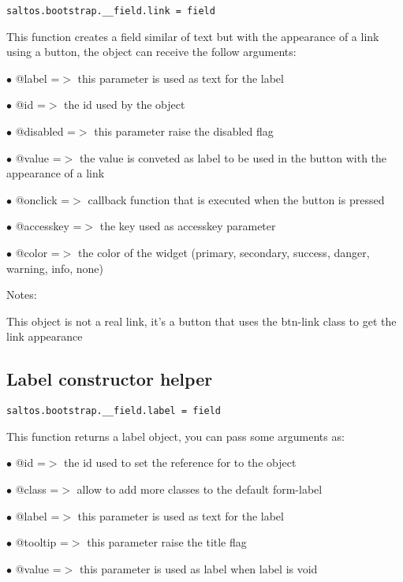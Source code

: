 \documentclass[a4paper]{book}
\begin{document}
\begin{lstlisting}
saltos.bootstrap.__field.link = field
\end{lstlisting}

This function creates a field similar of text but with the appearance of a link using a button,
the object can receive the follow arguments:

\begin{compactitem}
\item[\color{myblue}$\bullet$] @label     =$>$ this parameter is used as text for the label
\item[\color{myblue}$\bullet$] @id        =$>$ the id used by the object
\item[\color{myblue}$\bullet$] @disabled  =$>$ this parameter raise the disabled flag
\item[\color{myblue}$\bullet$] @value     =$>$ the value is conveted as label to be used in the button with the appearance of a link
\item[\color{myblue}$\bullet$] @onclick   =$>$ callback function that is executed when the button is pressed
\item[\color{myblue}$\bullet$] @accesskey =$>$ the key used as accesskey parameter
\item[\color{myblue}$\bullet$] @color     =$>$ the color of the widget (primary, secondary, success, danger, warning, info, none)
\end{compactitem}

Notes:

This object is not a real link, it's a button that uses the btn-link class to get the link
appearance

\hypertarget{toc480}{}
\subsection{Label constructor helper}

\begin{lstlisting}
saltos.bootstrap.__field.label = field
\end{lstlisting}

This function returns a label object, you can pass some arguments as:

\begin{compactitem}
\item[\color{myblue}$\bullet$] @id      =$>$ the id used to set the reference for to the object
\item[\color{myblue}$\bullet$] @class   =$>$ allow to add more classes to the default form-label
\item[\color{myblue}$\bullet$] @label   =$>$ this parameter is used as text for the label
\item[\color{myblue}$\bullet$] @tooltip =$>$ this parameter raise the title flag
\item[\color{myblue}$\bullet$] @value   =$>$ this parameter is used as label when label is void
\end{compactitem}
\end{document}
